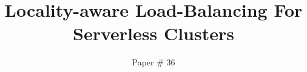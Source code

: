 \documentclass[sigconf,review]{acmart}
\begin{document}
\date{}

\title{Locality-aware Load-Balancing For Serverless Clusters}

\author{Paper \# 36}


\begin{abstract}
  
\end{abstract}

\maketitle

















{


%
}
\end{document}
